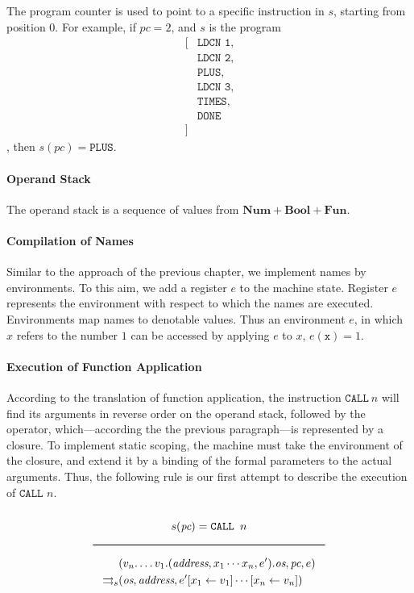 \begin{appendices}
The program counter is used to point to a specific instruction in \(s\), starting from position 0.
For example, if \(\textit{pc} = 2\), and \(s\) is the program
$$\begin{aligned}
\lbrack&\texttt{LDCN 1},\\
&\texttt{LDCN 2},\\
&\texttt{PLUS},\\
&\texttt{LDCN 3},\\
&\texttt{TIMES},\\
&\texttt{DONE}\\
\rbrack
\end{aligned}$$
, then \(s(\textit{pc}) = \texttt{PLUS}\).

\paragraph{Operand Stack}
The operand stack is a sequence of values from \(\textbf{Num}+\textbf{Bool}+\textbf{Fun}\).

\paragraph{Compilation of Names}
Similar to the approach of the previous chapter, we implement names by environments. To this aim, we add a register \(e\) to the machine state. Register \(e\) represents the environment with respect to which the names are executed. Environments map names to denotable values. Thus an environment \(e\), in which \(x\) refers to the number \(1\) can be accessed by applying \(e\) to \(x\), \(e(\texttt{x}) = 1\).

\paragraph{Execution of Function Application}
According to the translation of function application, the instruction \(\texttt{CALL}\ n\) will find its arguments in reverse order on the operand stack, followed by the operator, which---according the the previous paragraph---is represented by a closure. To implement static scoping, the machine must take the environment of the closure, and extend it by a binding of the formal parameters to the actual arguments. Thus, the following rule is our first attempt to describe the execution of \(\texttt{CALL } n\).

$$\Rule{s(\textit{pc}) = \texttt{CALL } n}{
\begin{aligned}
&(v_n.\ldots v_1.(\textit{address},x_1\cdots x_n,e').\textit{os},\textit{pc},e)\\
\transition &(\textit{os},\textit{address},e'[x_1 \leftarrow v_1]\cdots[x_n \leftarrow v_n])
\end{aligned}}$$


\end{appendices}
